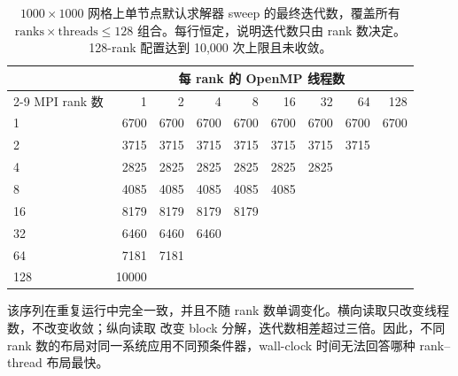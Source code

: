 \documentclass[11pt,a4paper,oneside]{report}
\begin{document}
\begin{table}[htbp]
  \centering
  \caption{$1000\times1000$ 网格上单节点默认求解器 sweep 的最终迭代数，覆盖所有
  $\text{ranks}\times\text{threads}\leq128$ 组合。每行恒定，说明迭代数只由 rank 数决定。
  128-rank 配置达到 10,000 次上限且未收敛。}
  \label{tab:iterations-rank}
  \begin{tabular}{lrrrrrrrr}
    \toprule
    & \multicolumn{8}{c}{每 rank 的 OpenMP 线程数} \\
    \cmidrule(lr){2-9}
    MPI rank 数 & 1 & 2 & 4 & 8 & 16 & 32 & 64 & 128 \\
    \midrule
    1   &  6700 & 6700 & 6700 & 6700 & 6700 & 6700 & 6700 & 6700 \\
    2   &  3715 & 3715 & 3715 & 3715 & 3715 & 3715 & 3715 &      \\
    4   &  2825 & 2825 & 2825 & 2825 & 2825 & 2825 &      &      \\
    8   &  4085 & 4085 & 4085 & 4085 & 4085 &      &      &      \\
    16  &  8179 & 8179 & 8179 & 8179 &      &      &      &      \\
    32  &  6460 & 6460 & 6460 &      &      &      &      &      \\
    64  &  7181 & 7181 &      &      &      &      &      &      \\
    128 & 10000 &      &      &      &      &      &      &      \\
    \bottomrule
  \end{tabular}
\end{table}

该序列在重复运行中完全一致，并且不随 rank 数单调变化。横向读取只改变线程数，不改变收敛；纵向读取
改变 block 分解，迭代数相差超过三倍。因此，不同 rank 数的布局对同一系统应用不同预条件器，wall-clock
时间无法回答哪种 rank--thread 布局最快。
\end{document}
